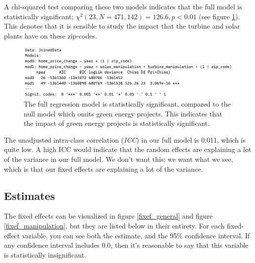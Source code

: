 \documentclass{article}
\begin{document}
A chi-squared test comparing these two models indicates that the full model is statistically significant; 
${\chi}^2(23, N=471,142)=126.6, p < 0.01$
(see figure \ref{anova}).
This denotes that it is sensible to study the impact that the turbine and solar plants have on these zip-codes.

\begin{figure}[h]
\centering
\includegraphics[width=0.9\linewidth]
{lmer_mod_anova.jpg} 
\caption{The full regression model is statistically significant, compared to the null model which omits green energy projects. This indicates that the impact of green energy projects is statistically significant.}
\label{anova}
\end{figure}

The unadjusted intra-class correlation (\emph{ICC}) in our full model is 0.011, which is quite low.
A high ICC would indicate that the random effects are explaining a lot of the variance in our full model.
We don't want this; we want what we see, which is that our fixed effects are explaining a lot of the variance. 

\subsection{Estimates}

The fixed effects can be visualized in figure \ref{fixef_general} and figure \ref{fixef_manipulation}, but they are listed below in their entirety.
For each fixed-effect variable, you can see both the estimate, and the 95\% confidence interval.
If any confidence interval includes 0.0, then it's reasonable to say that this variable is statistically insignificant.
\end{document}
